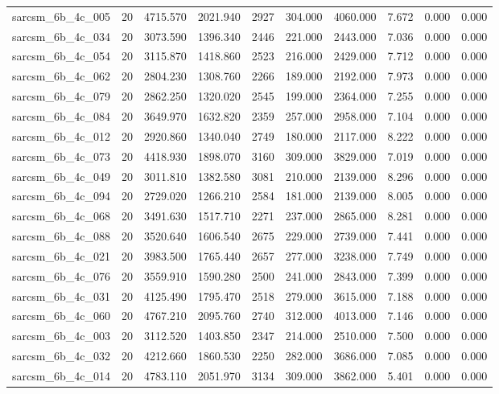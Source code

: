 \begin{tabular}{lrrrrrrrrr}
sarcsm\_6b\_4c\_005 & 20 & 4715.570 & 2021.940 & 2927 & 304.000 & 4060.000 & 7.672 & 0.000 & 0.000 \\
sarcsm\_6b\_4c\_034 & 20 & 3073.590 & 1396.340 & 2446 & 221.000 & 2443.000 & 7.036 & 0.000 & 0.000 \\
sarcsm\_6b\_4c\_054 & 20 & 3115.870 & 1418.860 & 2523 & 216.000 & 2429.000 & 7.712 & 0.000 & 0.000 \\
sarcsm\_6b\_4c\_062 & 20 & 2804.230 & 1308.760 & 2266 & 189.000 & 2192.000 & 7.973 & 0.000 & 0.000 \\
sarcsm\_6b\_4c\_079 & 20 & 2862.250 & 1320.020 & 2545 & 199.000 & 2364.000 & 7.255 & 0.000 & 0.000 \\
sarcsm\_6b\_4c\_084 & 20 & 3649.970 & 1632.820 & 2359 & 257.000 & 2958.000 & 7.104 & 0.000 & 0.000 \\
sarcsm\_6b\_4c\_012 & 20 & 2920.860 & 1340.040 & 2749 & 180.000 & 2117.000 & 8.222 & 0.000 & 0.000 \\
sarcsm\_6b\_4c\_073 & 20 & 4418.930 & 1898.070 & 3160 & 309.000 & 3829.000 & 7.019 & 0.000 & 0.000 \\
sarcsm\_6b\_4c\_049 & 20 & 3011.810 & 1382.580 & 3081 & 210.000 & 2139.000 & 8.296 & 0.000 & 0.000 \\
sarcsm\_6b\_4c\_094 & 20 & 2729.020 & 1266.210 & 2584 & 181.000 & 2139.000 & 8.005 & 0.000 & 0.000 \\
sarcsm\_6b\_4c\_068 & 20 & 3491.630 & 1517.710 & 2271 & 237.000 & 2865.000 & 8.281 & 0.000 & 0.000 \\
sarcsm\_6b\_4c\_088 & 20 & 3520.640 & 1606.540 & 2675 & 229.000 & 2739.000 & 7.441 & 0.000 & 0.000 \\
sarcsm\_6b\_4c\_021 & 20 & 3983.500 & 1765.440 & 2657 & 277.000 & 3238.000 & 7.749 & 0.000 & 0.000 \\
sarcsm\_6b\_4c\_076 & 20 & 3559.910 & 1590.280 & 2500 & 241.000 & 2843.000 & 7.399 & 0.000 & 0.000 \\
sarcsm\_6b\_4c\_031 & 20 & 4125.490 & 1795.470 & 2518 & 279.000 & 3615.000 & 7.188 & 0.000 & 0.000 \\
sarcsm\_6b\_4c\_060 & 20 & 4767.210 & 2095.760 & 2740 & 312.000 & 4013.000 & 7.146 & 0.000 & 0.000 \\
sarcsm\_6b\_4c\_003 & 20 & 3112.520 & 1403.850 & 2347 & 214.000 & 2510.000 & 7.500 & 0.000 & 0.000 \\
sarcsm\_6b\_4c\_032 & 20 & 4212.660 & 1860.530 & 2250 & 282.000 & 3686.000 & 7.085 & 0.000 & 0.000 \\
sarcsm\_6b\_4c\_014 & 20 & 4783.110 & 2051.970 & 3134 & 309.000 & 3862.000 & 5.401 & 0.000 & 0.000 \\

\end{tabular}
